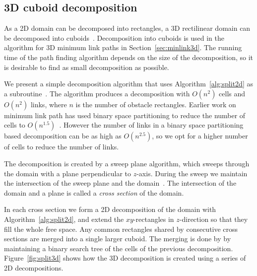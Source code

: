 \documentclass[english,gradu]{tktltiki2018}
\begin{document}
\subsection{3D cuboid decomposition}\label{sec:split3d}

As a 2D domain can be decomposed into rectangles, a 3D rectilinear domain can be decomposed into cuboids~\cite{restricted,wagner}.
Decomposition into cuboids is used in the algorithm for 3D minimum link paths in Section~\ref{sec:minlink3d}.
The running time of the path finding algorithm depends on the size of the decomposition, so it is desirable to find as small decomposition as possible.

We present a simple decomposition algorithm that uses Algorithm~\ref{alg:split2d} as a subroutine~\cite{restricted}.
The algorithm produces a decomposition with $O(n^2)$ cells and $O(n^2)$ links, where $n$ is the number of obstacle rectangles.
Earlier work on minimum link path has used binary space partitioning to reduce the number of cells to $O(n^{1.5})$~\cite{bsp,wagner}.
However the number of links in a binary space partitioning based decomposition can be as high as $O(n^{2.5})$, so we opt for a higher number of cells to reduce the number of links.

The decomposition is created by a sweep plane algorithm, which sweeps through the domain with a plane perpendicular to $z$-axis.
During the sweep we maintain the intersection of the sweep plane and the domain~\fspace.
The intersection of the domain and a plane is called a \emph{cross section} of the domain.

In each cross section we form a 2D decomposition of the domain with Algorithm~\ref{alg:split2d}, and extend the $xy$-rectangles in $z$-direction so that they fill the whole free space.
Any common rectangles shared by consecutive cross sections are merged into a single larger cuboid.
The merging is done by by maintaining a binary search tree of the cells of the previous decomposition.
Figure~\ref{fig:split3d} shows how the 3D decomposition is created using a series of 2D decompositions.
\end{document}

